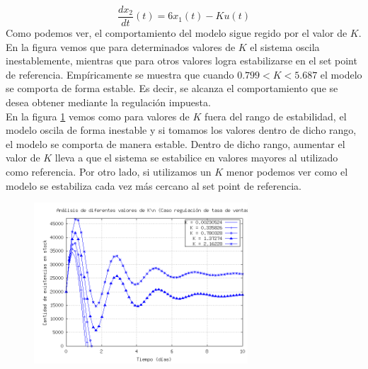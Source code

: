 \documentclass{sig-alternate}
\begin{document}
\begin{equation}
 \label{eq:x_2dot}
 \frac{dx_{2}}{dt}(t) = 6x_1(t) - Ku(t)
\end{equation}
Como podemos ver, el comportamiento del modelo sigue regido por el valor de $K$. En la figura vemos que para determinados valores de $K$ el sistema
oscila inestablemente, mientras que para otros valores logra estabilizarse en el set point de referencia. Empíricamente se muestra que cuando $0.799 < K < 5.687$ el modelo se comporta de forma estable. 
Es decir, se alcanza el comportamiento que se desea obtener mediante la regulación impuesta.\\
En la figura \ref{fig:lazo_cerrado_var_tventas} vemos como para valores de $K$ fuera del rango de estabilidad, el modelo oscila de
forma inestable y si tomamos los valores dentro de dicho rango, el modelo se comporta de manera estable. Dentro de dicho rango, aumentar el 
valor de $K$ lleva a que el sistema se estabilice en valores mayores al utilizado como referencia. Por otro lado, si utilizamos un $K$ menor podemos ver como el 
modelo se estabiliza cada vez más cercano al set point de referencia.

\begin{figure}[h]
\begin{center}
\includegraphics[width=8cm]{../src/k_plot2.png}
\caption{\label{fig:lazo_cerrado_var_tventas} }
\end{center}
\end{figure}
\end{document}
